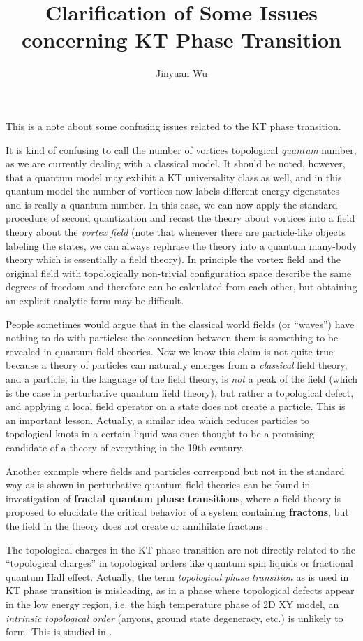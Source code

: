 \documentclass[hyperref, a4paper]{article}
\title{Clarification of Some Issues concerning KT Phase Transition}
\author{Jinyuan Wu}
\newcommand*{\concept}[1]{{\textbf{#1}}}
\begin{document}
\maketitle

This is a note about some confusing issues related to the KT phase transition.

It is kind of confusing to call the number of vortices topological \emph{quantum} number, as we are currently dealing with a classical model.
It should be noted, however, that a quantum model may exhibit a KT universality class as well, and in this quantum model the number of vortices now labels different energy eigenstates and is really a quantum number.
In this case, we can now apply the standard procedure of second quantization and recast the theory about vortices into a field theory about the \emph{vortex field} (note that whenever there are particle-like objects labeling the states, we can always rephrase the theory into a quantum many-body theory which is essentially a field theory).
In principle the vortex field and the original field with topologically non-trivial configuration space describe the same degrees of freedom and therefore can be calculated from each other, but obtaining an explicit analytic form may be difficult.

People sometimes would argue that in the classical world fields (or ``waves'') have nothing to do with particles: the connection between them is something to be revealed in quantum field theories.
Now we know this claim is not quite true because a theory of particles can naturally emerges from a \emph{classical} field theory, and a particle, in the language of the field theory, is \emph{not} a peak of the field (which is the case in perturbative quantum field theory), but rather a topological defect, and applying a local field operator on a state does not create a particle.
This is an important lesson.
Actually, a similar idea which reduces particles to topological knots in a certain liquid was once thought to be a promising candidate of a theory of everything in the 19th century.

Another example where fields and particles correspond but not in the standard way as is shown in perturbative quantum field theories can be found in investigation of \concept{fractal quantum phase transitions}, where a field theory is proposed to elucidate the critical behavior of a system containing \concept{fractons}, but the field in the theory does not create or annihilate fractons \cite{zhou2021fractal}.

The topological charges in the KT phase transition are not directly related to the ``topological charges'' in topological orders like quantum spin liquids or fractional quantum Hall effect.
Actually, the term \emph{topological phase transition} as is used in KT phase transition is misleading, 
as in a phase where topological defects appear in the low energy region, i.e. the high temperature 
phase of 2D XY model, an \emph{intrinsic topological order} (anyons, ground state degeneracy, etc.) is unlikely to form. 
This is studied in \cite{wen2019}.


 
\end{document}
